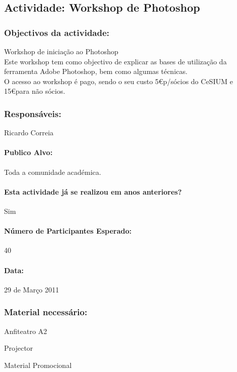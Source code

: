 
\subsection{Actividade: Workshop de Photoshop} 

\subsubsection*{Objectivos da actividade:}
\indent Workshop de iniciação ao Photoshop\\
\indent Este workshop tem como objectivo de explicar as bases de utilização da ferramenta Adobe Photoshop, bem como algumas técnicas.\\
\indent O acesso ao workshop é pago, sendo o seu custo 5\euro p/sócios do CeSIUM e 15\euro para não sócios.
\subsubsection*{Responsáveis:}
\begin{itemizedash}
	\item{Ricardo Correia}
\end{itemizedash}

\paragraph{Publico Alvo: }
Toda a comunidade académica.

\paragraph{Esta actividade já se realizou em anos anteriores?}
Sim

\paragraph{Número de Participantes Esperado:}
40

\paragraph{Data:} 29 de Março 2011

\subsubsection*{Material necessário:}
\begin{itemizedash}
	\item{Anfiteatro A2}
	\item{Projector}
	\item{Material Promocional}
\end{itemizedash}

